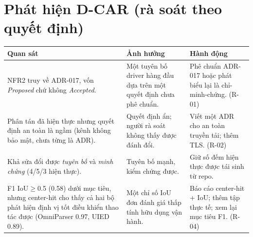 \documentclass[11pt,a4paper]{report}
\begin{document}
\section{Phát hiện D-CAR (rà soát theo quyết định)}
\begin{longtable}{@{}p{4.6cm}p{5.0cm}p{4.4cm}@{}}
\toprule
\textbf{Quan sát} & \textbf{Ảnh hưởng} & \textbf{Hành động} \\
\midrule
\endhead
NFR2 truy về ADR-017, vốn \emph{Proposed} chứ không \emph{Accepted}. & Một tuyên bố driver hàng đầu dựa trên một quyết định chưa phê chuẩn. & Phê chuẩn ADR-017 hoặc phát biểu lại là chỉ-minh-chứng. (R-01) \\
Phân tán đã hiện thực nhưng quyết định an toàn là ngầm (kênh không bảo mật, chưa từng là ADR). & Quyết định ẩn; người rà soát không thấy được đánh đổi. & Viết một ADR cho an toàn truyền tải; thêm TLS. (R-02) \\
Khả sửa đổi được \emph{tuyên bố} và \emph{minh chứng} (4/5/3 hiện thực). & Tuyên bố mạnh, kiểm chứng được. & Giữ số đếm hiện thực được tái sinh từ repo. \\
F1 IoU$\geq$0.5 (0.58) dưới mục tiêu, nhưng center-hit cho thấy cả hai bộ phát hiện định vị tốt điều khiển thao tác được (OmniParser 0.97, UIED 0.89). & Một chỉ số IoU đơn đánh giá thấp tính hữu dụng vận hành. & Báo cáo center-hit + IoU; thêm tập thực tế; xem lại mục tiêu F1. (R-04) \\
\bottomrule
\end{longtable}

\end{document}
